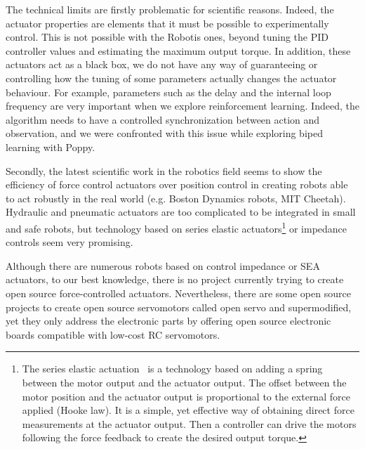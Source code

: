 The technical limits are firstly problematic for scientific reasons. Indeed, the actuator properties are elements that it must be possible to experimentally control. This is not possible with the Robotis ones, beyond tuning the PID controller values and estimating the maximum output torque. In addition, these actuators act as a black box, we do not have any way of guaranteeing or controlling how the tuning of some parameters actually changes the actuator behaviour. For example, parameters such as the delay and the internal loop frequency are very important when we explore reinforcement learning. Indeed, the algorithm needs to have a controlled synchronization between action and observation, and we were confronted with this issue while exploring biped learning with Poppy.

Secondly, the latest scientific work in the robotics field seems to show the efficiency of force control actuators over position control in creating robots able to act robustly in the real world (e.g. Boston Dynamics robots, MIT Cheetah). Hydraulic and pneumatic actuators are too complicated to be integrated in small and safe robots, but technology based on series elastic actuators\footnote{The series elastic actuation~\parencite{pratt1995series} is a technology based on adding a spring between the motor output and the actuator output. The offset between the motor position and the actuator output is proportional to the external force applied (Hooke law). It is a simple, yet effective way of obtaining direct force measurements at the actuator output. Then a controller can drive the motors following the force feedback to create the desired output torque.} or impedance controls seem very promising.





Although there are numerous robots based on control impedance or SEA actuators, to our best knowledge, there is no project currently trying to create open source force-controlled actuators. Nevertheless, there are some open source projects to create open source servomotors called open servo and supermodified, yet they only address the electronic parts by offering open source electronic boards compatible with low-cost RC servomotors.


